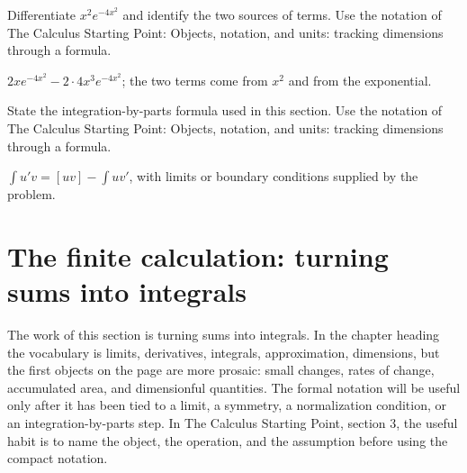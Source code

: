\begin{exercise}
Differentiate \(x^2e^{-4x^2}\) and identify the two sources of terms.  Use the notation of The Calculus Starting Point: Objects, notation, and units: tracking dimensions through a formula.
\begin{answer}
\(2xe^{-4x^2}-2\cdot 4x^3e^{-4x^2}\); the two terms come from \(x^2\) and from the exponential.
\end{answer}
\end{exercise}

\begin{exercise}
State the integration-by-parts formula used in this section.  Use the notation of The Calculus Starting Point: Objects, notation, and units: tracking dimensions through a formula.
\begin{answer}
\(\int u'v=[uv]-\int uv'\), with limits or boundary conditions supplied by the problem.
\end{answer}
\end{exercise}



\section{The finite calculation: turning sums into integrals}













The work of this section is turning sums into integrals.  In the chapter heading the vocabulary is limits, derivatives, integrals, approximation, dimensions, but the first objects on the page are more prosaic: small changes, rates of change, accumulated area, and dimensionful quantities.  The formal notation will be useful only after it has been tied to a limit, a symmetry, a normalization condition, or an integration-by-parts step.  In The Calculus Starting Point, section 3, the useful habit is to name the object, the operation, and the assumption before using the compact notation.

